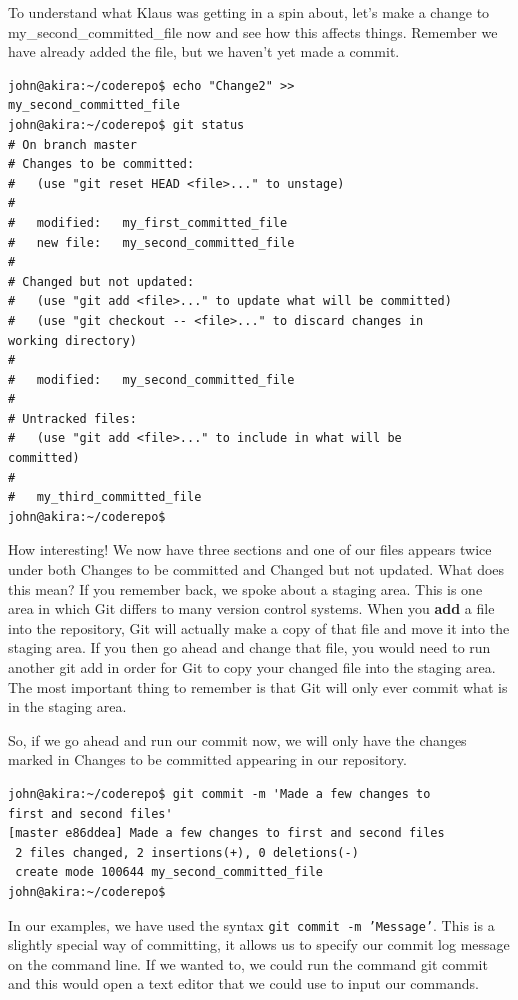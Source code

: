 To understand what Klaus was getting in a spin about, let's make a change to my\_second\_committed\_file now and see how this affects things.  Remember we have already added the file, but we haven't yet made a commit.

\begin{Verbatim}[frame=leftline,framerule=1mm,fontsize=\relsize{-3}] 
john@akira:~/coderepo$ echo "Change2" >> 
my_second_committed_file 
john@akira:~/coderepo$ git status
# On branch master
# Changes to be committed:
#   (use "git reset HEAD <file>..." to unstage)
#
#	modified:   my_first_committed_file
#	new file:   my_second_committed_file
#
# Changed but not updated:
#   (use "git add <file>..." to update what will be committed)
#   (use "git checkout -- <file>..." to discard changes in 
working directory)
#
#	modified:   my_second_committed_file
#
# Untracked files:
#   (use "git add <file>..." to include in what will be 
committed)
#
#	my_third_committed_file
john@akira:~/coderepo$ 
\end{Verbatim} 

How interesting!  We now have three sections and one of our files appears twice under both Changes to be committed and Changed but not updated.  What does this mean?  If you remember back, we spoke about a staging area.  This is one area in which Git differs to many version control systems.  When you \textbf{add} a file into the repository, Git will actually make a copy of that file and move it into the staging area.  If you then go ahead and change that file, you would need to run another git add in order for Git to copy your changed file into the staging area.  The most important thing to remember is that Git will only ever commit what is in the staging area.

So, if we go ahead and run our commit now, we will only have the changes marked in Changes to be committed appearing in our repository.  

\begin{Verbatim}[frame=leftline,framerule=1mm,fontsize=\relsize{-3}] 
john@akira:~/coderepo$ git commit -m 'Made a few changes to 
first and second files'
[master e86ddea] Made a few changes to first and second files
 2 files changed, 2 insertions(+), 0 deletions(-)
 create mode 100644 my_second_committed_file
john@akira:~/coderepo$ 
\end{Verbatim} 

In our examples, we have used the syntax \texttt{git commit -m 'Message'}.  This is a slightly special way of committing, it allows us to specify our commit log message on the command line.  If we wanted to, we could run the command git commit and this would open a text editor that we could use to input our commands.

